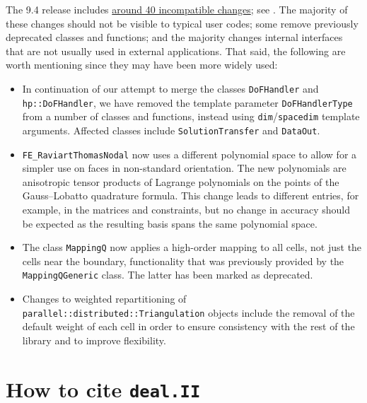 \documentclass{ansarticle-preprint}
\newcommand{\specialword}[1]{\texttt{#1}}
\newcommand{\dealii}{{\specialword{deal.II}}\xspace}
\begin{document}
The 9.4 release includes
\href{https://dealii.org/developer/doxygen/deal.II/changes_between_9_3_0_and_9_4_0.html}
{around 40 incompatible changes}; see \cite{changes94}. The majority of these changes
should not be visible to typical user codes; some remove previously
deprecated classes and functions; and the majority changes internal
interfaces that are not usually used in external
applications. That said, the following are worth mentioning since they
may have been more widely used:
\begin{itemize}
  \item In continuation of our attempt to merge the classes \texttt{DoFHandler} and \texttt{hp::DoFHandler}, we have removed the
  template parameter \texttt{DoFHandlerType} from a number of classes and
  functions, instead using \texttt{dim}/\texttt{spacedim} template arguments. Affected
  classes include \texttt{SolutionTransfer} and \texttt{DataOut}.
  \item \texttt{FE\_RaviartThomasNodal} now uses a different polynomial space to allow
  for a simpler use on faces in non-standard orientation. The new polynomials
  are anisotropic tensor products of Lagrange polynomials on the points of the
  Gauss--Lobatto quadrature formula. This change leads to different entries, for example, in
  the matrices and constraints, but no change in accuracy should be expected as
  the resulting basis spans the same polynomial space.
  \item The class \texttt{MappingQ} now applies a high-order mapping
    to all cells, not just the cells near the boundary, functionality
    that was previously provided by the \texttt{MappingQGeneric}
    class. The latter has been marked as deprecated.
  \item Changes to weighted repartitioning of
    \texttt{parallel::distributed::Triangulation} objects include
  the removal of the default weight of each cell in order to ensure
  consistency with the rest of the library and to improve flexibility.
\end{itemize}



\section{How to cite \dealii}\label{sec:cite}
\end{document}
